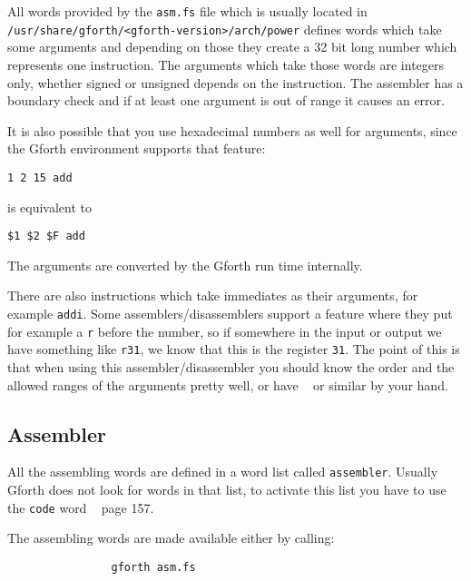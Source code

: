     All words provided by the \texttt{asm.fs} file which is usually located
    in \\ \texttt{/usr/share/gforth/<gforth-version>/arch/power} defines 
        words which take some arguments and depending on those they create a 
        32 bit long number which represents one instruction. The arguments 
        which take those words are integers only, whether signed or unsigned 
        depends on the instruction. The assembler has a boundary check and if 
        at least one argument is out of range it causes an error.

        It is also possible that you use hexadecimal numbers as well for 
        arguments, since the Gforth environment supports that feature:

        \begin{verbatim}1 2 15 add\end{verbatim}

        is equivalent to

        \begin{verbatim}$1 $2 $F add\end{verbatim}
        
        The arguments are converted by the Gforth run time internally.

        There are also instructions which take immediates as their arguments, 
        for example \texttt{addi}. Some assemblers/disassemblers support a 
        feature where they put for example a \texttt{r} before the number, so if
        somewhere in the input or output we have something like \texttt{r31}, we
        know that this is the register \texttt{31}. The point of this is that
        when using this assembler/disassembler you should know the order and the
        allowed ranges of the arguments pretty well, or have ~\cite{ppcman} 
        or similar by your hand.

    \subsection{Assembler}

        All the assembling words are defined in a word list called
        \texttt{assembler}. Usually Gforth does not look for words in that list,
        to activate this list you have to use the \texttt{code} word
        ~\cite{gforthman} page 157.

        The assembling words are made available either by calling:
            
            \begin{verbatim}
                gforth asm.fs
            \end{verbatim}

